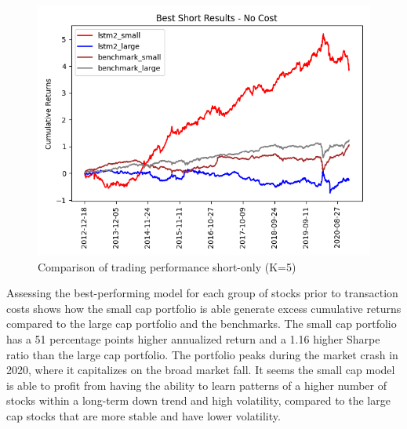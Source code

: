 \indent\newline 
\begin{figure}[H]
\centering
\includegraphics [scale=0.60,angle=360]{figures/cumulative_best_short_mix_return_no_cost.png}
\caption{Comparison of trading performance short-only (K=5)}
\label{fig:shortcomparison}
\end{figure} 
\indent\newline 
Assessing the best-performing model for each group of stocks prior to transaction costs shows how the small cap portfolio is able generate excess cumulative returns compared to the large cap portfolio and the benchmarks. The small cap portfolio has a 51 percentage points higher annualized return and a 1.16 higher Sharpe ratio than the large cap portfolio. The portfolio peaks during the market crash in 2020, where it capitalizes on the broad market fall. It seems the small cap model is able to profit from having the ability to learn patterns of a higher number of stocks within a long-term down trend and high volatility, compared to the large cap stocks that are more stable and have lower volatility.    


